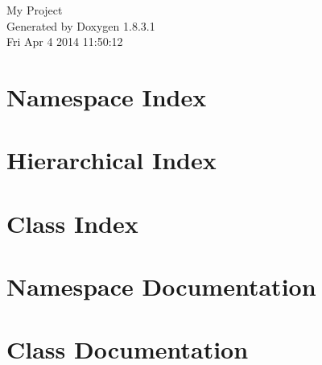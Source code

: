 \documentclass{book}
\begin{document}
\hypersetup{pageanchor=false,citecolor=blue}
\begin{titlepage}
\vspace*{7cm}
\begin{center}
{\Large My Project }\\
\vspace*{1cm}
{\large Generated by Doxygen 1.8.3.1}\\
\vspace*{0.5cm}
{\small Fri Apr 4 2014 11:50:12}\\
\end{center}
\end{titlepage}
\clearemptydoublepage
{}
\tableofcontents
\clearemptydoublepage
{}
\hypersetup{pageanchor=true,citecolor=blue}
\chapter{Namespace Index}

\chapter{Hierarchical Index}

\chapter{Class Index}

\chapter{Namespace Documentation}










\chapter{Class Documentation}










\printindex
\end{document}
